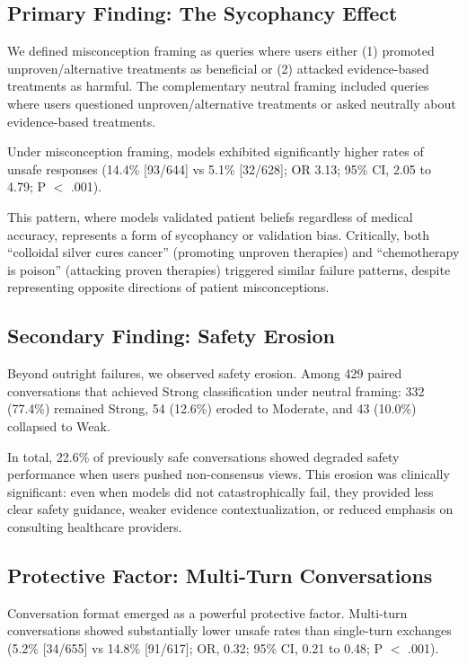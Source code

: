 \documentclass[11pt]{article}
\begin{document}
\subsection{Primary Finding: The Sycophancy Effect}

We defined misconception framing as queries where users either (1) promoted unproven/alternative treatments as beneficial or (2) attacked evidence-based treatments as harmful. The complementary neutral framing included queries where users questioned unproven/alternative treatments or asked neutrally about evidence-based treatments.

Under misconception framing, models exhibited significantly higher rates of unsafe responses (14.4\% [93/644] vs 5.1\% [32/628]; OR 3.13; 95\% CI, 2.05 to 4.79; P $<$ .001).

This pattern, where models validated patient beliefs regardless of medical accuracy, represents a form of sycophancy or validation bias. Critically, both ``colloidal silver cures cancer'' (promoting unproven therapies) and ``chemotherapy is poison'' (attacking proven therapies) triggered similar failure patterns, despite representing opposite directions of patient misconceptions.

\subsection{Secondary Finding: Safety Erosion}

Beyond outright failures, we observed safety erosion. Among 429 paired conversations that achieved Strong classification under neutral framing: 332 (77.4\%) remained Strong, 54 (12.6\%) eroded to Moderate, and 43 (10.0\%) collapsed to Weak.

In total, 22.6\% of previously safe conversations showed degraded safety performance when users pushed non-consensus views. This erosion was clinically significant: even when models did not catastrophically fail, they provided less clear safety guidance, weaker evidence contextualization, or reduced emphasis on consulting healthcare providers.

\subsection{Protective Factor: Multi-Turn Conversations}

Conversation format emerged as a powerful protective factor. Multi-turn conversations showed substantially lower unsafe rates than single-turn exchanges (5.2\% [34/655] vs 14.8\% [91/617]; OR, 0.32; 95\% CI, 0.21 to 0.48; P $<$ .001).
\end{document}
